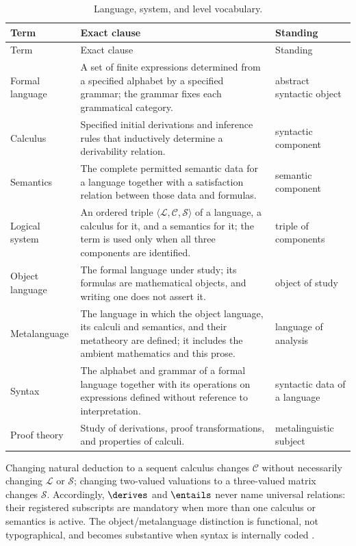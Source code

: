 \begingroup\small
\begin{longtable}{@{}p{}p{}p{}@{}}
\caption{Language, system, and level vocabulary.}
\label{tab:p01-level-vocabulary}\\
\toprule
Term & Exact clause & Standing \\
\midrule
\endfirsthead
\toprule
Term & Exact clause & Standing \\
\midrule
\endhead
Formal language\index{formal language} & A set of finite expressions
determined from a specified alphabet by a specified grammar; the grammar
fixes each grammatical category. & abstract syntactic object \\
Calculus\index{calculus} & Specified initial derivations and inference rules
that inductively determine a derivability relation. & syntactic component \\
Semantics\index{semantics} & The complete permitted semantic data for a
language together with a satisfaction relation between those data and
formulas. & semantic component \\
Logical system\index{logical system} & An ordered triple
\(\langle\mathcal L,\mathcal C,\mathcal S\rangle\) of a language, a
calculus for it, and a semantics for it; the term is used only when all three
components are identified. & triple of components \\
Object language\index{object language} & The formal language under study; its
formulas are mathematical objects, and writing one does not assert it. &
object of study \\
Metalanguage\index{metalanguage} & The language in which the object language,
its calculi and semantics, and their metatheory are defined; it includes the
ambient mathematics and this prose. & language of analysis \\
Syntax\index{syntax} & The alphabet and grammar of a formal language together
with its operations on expressions defined without reference to
interpretation. & syntactic data of a language \\
Proof theory\index{proof theory} & Study of derivations, proof
transformations, and properties of calculi. & metalinguistic subject \\
\bottomrule
\end{longtable}
\endgroup

Changing natural deduction to a sequent calculus changes \(\mathcal C\)
without necessarily changing \(\mathcal L\) or \(\mathcal S\); changing
two-valued valuations to a three-valued matrix changes \(\mathcal S\).
Accordingly, \(\derives\) and \(\entails\) never name universal relations:
their registered subscripts are mandatory when more than one calculus or
semantics is active.  The object/metalanguage distinction is functional, not
typographical, and becomes substantive when syntax is internally coded
\cite{Tarski1983}.

